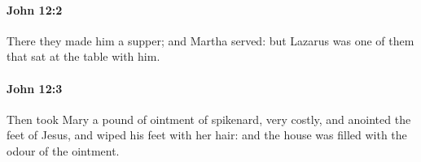 		\paragraph{John 12:2} %
			\label{JOHN-12-2}

			There they made him a supper; and Martha served: but Lazarus was one of them that sat at the table with him.

			\begin{framed}
				\scriptsize
				\begin{compactdesc}
					\item[SBLG] 
				\end{compactdesc}
			\end{framed}

		\paragraph{John 12:3} %
			\label{JOHN-12-3}

			Then took Mary a pound of ointment of spikenard, very costly, and anointed the feet of Jesus, and wiped his feet with her hair: and the house was filled with the odour of the ointment.

